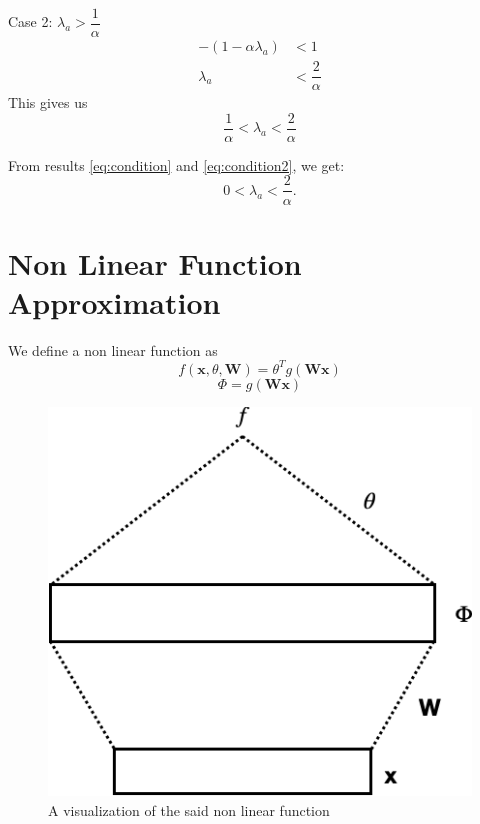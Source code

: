 \documentclass[twoside]{article}
\begin{document}
Case 2: $\lambda_a > \dfrac{1}{\alpha}$
\begin{equation}
    \begin{split}
        -(1 - \alpha \lambda_a) &< 1\\
        \lambda_a &< \dfrac{2}{\alpha}
    \end{split}
\end{equation}
This gives us 
\begin{equation}\label{eq:condition2}
    \dfrac{1}{\alpha} < \lambda_a < \dfrac{2}{\alpha}
\end{equation}

From results \ref{eq:condition} and \ref{eq:condition2}, we get:
\begin{equation}\label{eq:final_condition}
    0 < \lambda_a < \dfrac{2}{\alpha}.
\end{equation}


\section{Non Linear Function Approximation}
We define a non linear function as \begin{equation}\label{eq:non_linear_function}
    f(\textbf{x}, \theta, \textbf{W}) = \theta^T g(\textbf{W}\textbf{x})
\end{equation}
\begin{equation}\label{eq:g_function}
    \Phi = g(\textbf{W}\textbf{x})
\end{equation}
\begin{figure}[!htp]
  \centering
  \includegraphics[scale=0.3]{images/nnet.png}
  \caption{A visualization of the said non linear function}
\end{figure}
\end{document}
